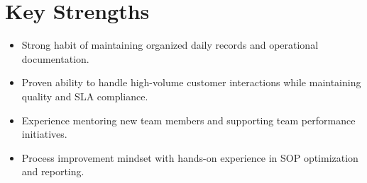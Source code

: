 \documentclass[11pt,a4paper]{article}
\begin{document}
\section*{Key Strengths}
\begin{itemize}[leftmargin=*]
\item Strong habit of maintaining organized daily records and operational documentation.
\item Proven ability to handle high-volume customer interactions while maintaining quality and SLA compliance.
\item Experience mentoring new team members and supporting team performance initiatives.
\item Process improvement mindset with hands-on experience in SOP optimization and reporting.
\end{itemize}
\end{document}
